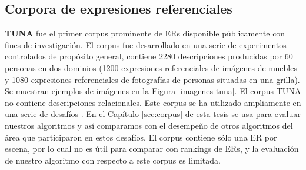 \subsection{Corpora de expresiones referenciales}
\label{sec:corpus2}
\label{sec:corpusTUNA}

{\bf TUNA} \cite{tuna-corpus} fue el primer corpus prominente de ERs disponible p\'ublicamente con fines de investigaci\'on. El corpus fue desarrollado en una serie de experimentos controlados de prop\'osito general, contiene 2280 descripciones producidas por 60 personas en dos dominios (1200 expresiones referenciales de im\'agenes de muebles y 1080 expresiones referenciales de fotograf\'ias de personas situadas en una grilla). Se muestran ejemplos de im\'agenes en la Figura \ref{imagenes-tuna}. El corpus TUNA no contiene descripciones relacionales. Este corpus se ha utilizado ampliamente en una serie de desaf\'ios \cite{gatt09}. En el Cap\'itulo \ref{sec:corpus} de esta tesis se usa para evaluar nuestros algoritmos y as\'i comparamos con el desempe\~no de otros algoritmos del \'area que participaron en estos desaf\'ios. El corpus contiene s\'olo una ER por escena, por lo cual no es \'util para comparar con rankings de ERs, y la evaluaci\'on de nuestro algoritmo con respecto a este corpus es limitada.\\

